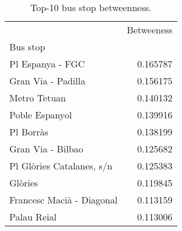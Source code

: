 \begin{table}[!htbp]
\centering
\caption{Top-10 bus stop betweenness.}
\label{tab:betweenness}
\begin{tabular}{lr}
\toprule
 & Betweeness \\
Bus stop &  \\
\midrule
Pl Espanya - FGC & 0.165787 \\
Gran Via - Padilla & 0.156175 \\
Metro Tetuan & 0.140132 \\
Poble Espanyol & 0.139916 \\
Pl Borràs & 0.138199 \\
Gran Via - Bilbao & 0.125682 \\
Pl Glòries Catalanes, s/n & 0.125383 \\
Glòries & 0.119845 \\
Francesc Macià - Diagonal & 0.113159 \\
Palau Reial & 0.113006 \\
\bottomrule
\end{tabular}
\end{table}
